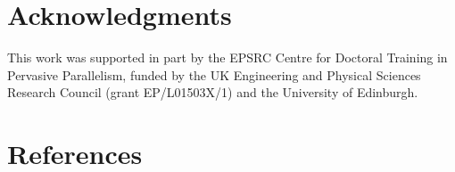 \documentclass[preprint,12pt]{elsarticle}
\theoremstyle{plain}
\begin{document}



%

\section*{Acknowledgments}

This work was supported in part by the EPSRC Centre for Doctoral Training in Pervasive Parallelism, funded by the UK Engineering and Physical Sciences Research Council (grant EP/L01503X/1) and the University of Edinburgh.

\section*{References}


\end{document}
